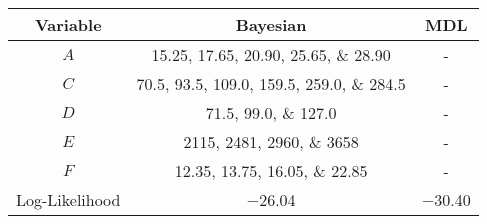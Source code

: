 \scriptsize
\begin{tabular}{@{}ccc@{}}
    \toprule
    Variable & Bayesian & MDL \\
    \midrule
    $A$ & \numlist[list-final-separator = {, }]{15.25; 17.65; 20.90; 25.65; 28.90} & - \\
    $C$ & \numlist[list-final-separator = {, }]{70.5; 93.5; 109.0; 159.5; 259.0; 284.5} & - \\
    $D$ & \numlist[list-final-separator = {, }]{71.5;99.0;127.0} & - \\
    $E$ & \numlist[list-final-separator = {, }]{2115;2481;2960;3658} & - \\
    $F$ & \numlist[list-final-separator = {, }]{12.35;13.75;16.05;22.85} & - \\
    \midrule
    Log-Likelihood & \num{-26.04} & \num{-30.40} \\
    \bottomrule
\end{tabular}